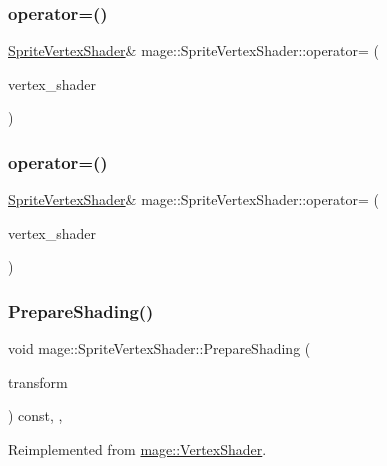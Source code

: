 \subsubsection{\texorpdfstring{operator=()}{operator=()}\hspace{0.1cm}{\footnotesize\ttfamily [1/2]}}
{\footnotesize\ttfamily \hyperlink{classmage_1_1_sprite_vertex_shader}{Sprite\+Vertex\+Shader}\& mage\+::\+Sprite\+Vertex\+Shader\+::operator= (\begin{DoxyParamCaption}\item[{const \hyperlink{classmage_1_1_sprite_vertex_shader}{Sprite\+Vertex\+Shader} \&}]{vertex\+\_\+shader }\end{DoxyParamCaption})\hspace{0.3cm}{\ttfamily [delete]}}

\hypertarget{classmage_1_1_sprite_vertex_shader_aac64cf5df2b118ba95be72aef2bd3dca}{}\label{classmage_1_1_sprite_vertex_shader_aac64cf5df2b118ba95be72aef2bd3dca} 
\subsubsection{\texorpdfstring{operator=()}{operator=()}\hspace{0.1cm}{\footnotesize\ttfamily [2/2]}}
{\footnotesize\ttfamily \hyperlink{classmage_1_1_sprite_vertex_shader}{Sprite\+Vertex\+Shader}\& mage\+::\+Sprite\+Vertex\+Shader\+::operator= (\begin{DoxyParamCaption}\item[{\hyperlink{classmage_1_1_sprite_vertex_shader}{Sprite\+Vertex\+Shader} \&\&}]{vertex\+\_\+shader }\end{DoxyParamCaption})\hspace{0.3cm}{\ttfamily [delete]}}

\hypertarget{classmage_1_1_sprite_vertex_shader_a10be47ca65f4baed735b5ffb52ee92bf}{}\label{classmage_1_1_sprite_vertex_shader_a10be47ca65f4baed735b5ffb52ee92bf} 
\subsubsection{\texorpdfstring{Prepare\+Shading()}{PrepareShading()}}
{\footnotesize\ttfamily void mage\+::\+Sprite\+Vertex\+Shader\+::\+Prepare\+Shading (\begin{DoxyParamCaption}\item[{I\+D3\+D11\+Buffer $\ast$}]{transform }\end{DoxyParamCaption}) const\hspace{0.3cm}{\ttfamily [final]}, {\ttfamily [override]}, {\ttfamily [virtual]}}



Reimplemented from \hyperlink{classmage_1_1_vertex_shader_a53f4b25241f6c5739724d421c9f29a36}{mage\+::\+Vertex\+Shader}.

